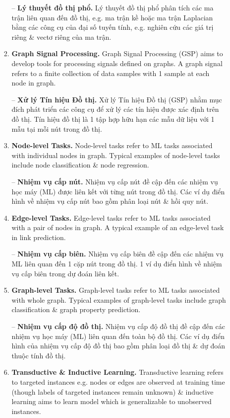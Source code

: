 \documentclass{article}
\begin{document}
\begin{itemize}
\begin{itemize}
\begin{enumerate}
            -- {\bf Lý thuyết đồ thị phổ.} Lý thuyết đồ thị phổ phân tích các ma trận liên quan đến đồ thị, e.g. ma trận kề hoặc ma trận Laplacian bằng các công cụ của đại số tuyến tính, e.g. nghiên cứu các giá trị riêng \& vectơ riêng của ma trận.
            \item {\bf Graph Signal Processing.} Graph Signal Processing (GSP) aims to develop tools for processing signals defined on graphs. A graph signal refers to a finite collection of data samples with 1 sample at each node in graph.

            -- {\bf Xử lý Tín hiệu Đồ thị.} Xử lý Tín hiệu Đồ thị (GSP) nhằm mục đích phát triển các công cụ để xử lý các tín hiệu được xác định trên đồ thị. Tín hiệu đồ thị là 1 tập hợp hữu hạn các mẫu dữ liệu với 1 mẫu tại mỗi nút trong đồ thị.
            \item {\bf Node-level Tasks.} Node-level tasks refer to ML tasks associated with individual nodes in graph. Typical examples of node-level tasks include node classification \& node regression.

            -- {\bf Nhiệm vụ cấp nút.} Nhiệm vụ cấp nút đề cập đến các nhiệm vụ học máy (ML) được liên kết với từng nút trong đồ thị. Các ví dụ điển hình về nhiệm vụ cấp nút bao gồm phân loại nút \& hồi quy nút.
            \item {\bf Edge-level Tasks.} Edge-level tasks refer to ML tasks associated with a pair of nodes in graph. A typical example of an edge-level task in link prediction.

            -- {\bf Nhiệm vụ cấp biên.} Nhiệm vụ cấp biên đề cập đến các nhiệm vụ ML liên quan đến 1 cặp nút trong đồ thị. 1 ví dụ điển hình về nhiệm vụ cấp biên trong dự đoán liên kết.
            \item {\bf Graph-level Tasks.} Graph-level tasks refer to ML tasks associated with whole graph. Typical examples of graph-level tasks include graph classification \& graph property prediction.

            -- {\bf Nhiệm vụ cấp độ đồ thị.} Nhiệm vụ cấp độ đồ thị đề cập đến các nhiệm vụ học máy (ML) liên quan đến toàn bộ đồ thị. Các ví dụ điển hình của nhiệm vụ cấp độ đồ thị bao gồm phân loại đồ thị \& dự đoán thuộc tính đồ thị.
            \item {\bf Transductive \& Inductive Learning.} Transductive learning refers to targeted instances e.g. nodes or edges are observed at training time (though labels of targeted instances remain unknown) \& inductive learning aims to learn model which is generalizable to unobserved instances.


\end{enumerate}
\end{itemize}
\end{itemize}
\end{document}
